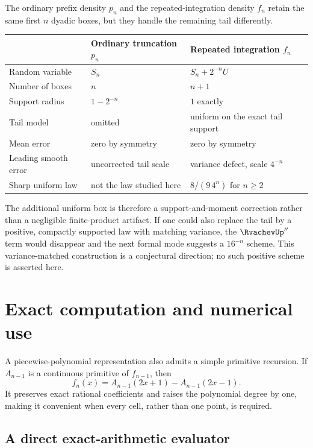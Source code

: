 \documentclass[11pt,oneside]{article}
\theoremstyle{definition}
\theoremstyle{remark}
\begin{document}
The ordinary prefix density $p_n$ and the repeated-integration density $f_n$ retain the
same first $n$ dyadic boxes, but they handle the remaining tail differently.
\begin{center}
\begin{tabularx}{0.96\textwidth}{@{}p{}XX@{}}
\toprule
 & Ordinary truncation $p_n$ & Repeated integration $f_n$\\
\midrule
Random variable & $S_n$ & $S_n+2^{-n}U$\\
Number of boxes & $n$ & $n+1$\\
Support radius & $1-2^{-n}$ & $1$ exactly\\
Tail model & omitted & uniform on the exact tail support\\
Mean error & zero by symmetry & zero by symmetry\\
Leading smooth error & uncorrected tail scale & variance defect, scale $4^{-n}$\\
Sharp uniform law & not the law studied here & $8/(9\,4^n)$ for $n\ge2$\\
\bottomrule
\end{tabularx}
\end{center}
The additional uniform box is therefore a support-and-moment correction rather than a
negligible finite-product artifact.  If one could also replace the tail by a positive,
compactly supported law with matching variance, the $\RvachevUp''$ term would disappear and the
next formal mode suggests a $16^{-n}$ scheme.  This variance-matched construction is a
conjectural direction; no such positive scheme is asserted here.

\section{Exact computation and numerical use}
\label{repeated2:sec:computation}

A piecewise-polynomial representation also admits a simple primitive recursion.  If
$A_{n-1}$ is a continuous primitive of $f_{n-1}$, then
\begin{equation}
 f_n(x)=A_{n-1}(2x+1)-A_{n-1}(2x-1).
 \label{repeated2:eq:primitive-algorithm}
\end{equation}
It preserves exact rational coefficients and raises the polynomial degree by one, making
it convenient when every cell, rather than one point, is required.

\subsection{A direct exact-arithmetic evaluator}
\end{document}
